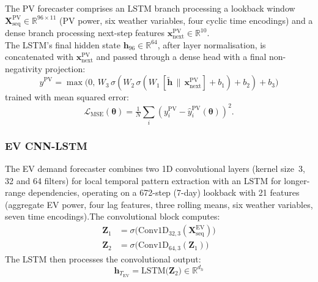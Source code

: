\documentclass[journal]{IEEEtran}
\newcommand{\loss}{\mathcal{L}}
\newcommand{\params}{\bm{\theta}}
\newcommand{\real}{\mathbb{R}}
\begin{document}
The PV forecaster comprises an LSTM branch processing a lookback window
$\mathbf{X}_{\mathrm{seq}}^{\mathrm{PV}} \in \real^{96 \times 11}$
(PV power, six weather variables, four cyclic time encodings) and a
dense branch processing next-step features $\mathbf{x}_{\mathrm{next}}^{\mathrm{PV}}
\in \real^{10}$.\\ 
The LSTM's final hidden state $\mathbf{h}_{96} \in
\real^{64}$, after layer normalisation, is concatenated with
$\mathbf{x}_{\mathrm{next}}^{\mathrm{PV}}$ and passed through a dense
head with a final non-negativity projection:
$$
    \hat{y}^{\mathrm{PV}} = \max\!\bigl(0,\, W_3\,\sigma(W_2\,\sigma(W_1\,
    [\tilde{\mathbf{h}} \,\|\, \mathbf{x}_{\mathrm{next}}^{\mathrm{PV}}]
    + b_1) + b_2) + b_3\bigr)
    \label{eq:pv_pred}
$$
trained with mean squared error:\\
\begin{equation}
\loss_{\mathrm{MSE}}(\params) = \tfrac{1}{N}\sum_i (y_i^{\mathrm{PV}} -
\hat{y}_i^{\mathrm{PV}}(\params))^2.
\label{eq:huber_loss1}
\end{equation}
\subsubsection{EV CNN-LSTM}

The EV demand forecaster combines two 1D convolutional layers (kernel
size~3, 32 and 64 filters) for local temporal pattern extraction with
an LSTM for longer-range dependencies, operating on a 672-step (7-day)
lookback with 21 features (aggregate EV power, four lag features, three
rolling means, six weather variables, seven time encodings).The convolutional block computes:
\begin{align}
    \mathbf{Z}_1 &= \sigma\bigl(\mathrm{Conv1D}_{32,3}(\mathbf{X}_{\mathrm{seq}}^{\mathrm{EV}})\bigr)
    \label{eq:conv1} \\
    \mathbf{Z}_2 &= \sigma\bigl(\mathrm{Conv1D}_{64,3}(\mathbf{Z}_1)\bigr)
    \label{eq:conv2}
\end{align}
The LSTM then processes the convolutional output:
\begin{equation}
    \mathbf{h}_{T_{\mathrm{EV}}} = \mathrm{LSTM}\bigl(\mathbf{Z}_2\bigr)
        \in \mathbb{R}^{d_h}
    \label{eq:lstm_ev}
\end{equation}
\end{document}
